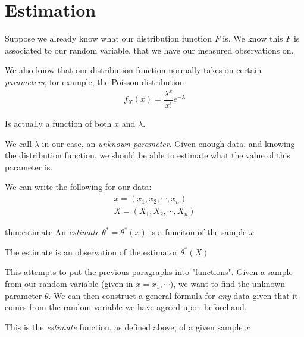 \section{Estimation}\par
\noindent Suppose we already know what our distribution function $F$ is. We know this $F$ is associated to our random variable, that we have our measured observations on.
\par
\noindent We also know that our distribution function normally takes on certain \textit{parameters}, for example, the Poisson distribution
\begin{equation*}
  \begin{gathered}
    f_X(x) = \dfrac{\lambda^x}{x!}e^{-\lambda}
  \end{gathered}
\end{equation*}\par
\noindent Is actually a function of both $x$ and $\lambda$.\par
\noindent We call $\lambda$ in our case, an \textit{unknown parameter}. Given enough data, and knowing the distribution function, we should be able to estimate what the value of this parameter is. 
\par\bigskip
\noindent We can write the following for our data:
\begin{equation*}
  \begin{gathered}
    x = (x_1,x_2,\cdots,x_n)\\
    X = (X_1,X_2,\cdots,X_n)
  \end{gathered}
\end{equation*}
\par\bigskip
\begin{theo}{thm:estimate}
  An \textit{estimate} $\theta^* = \theta^*(x)$ is a funciton of the sample $x$
  \par\bigskip
  \noindent The estimate is an observation of the estimator $\theta^*(X)$
\end{theo}
\par\bigskip
\noindent This attempts to put the previous paragraphs into "functions". Given a sample from our random variable (given in $x = x_1,\cdots$), we want to find the unknown parameter $\theta$. We can then construct a general formula for \textit{any} data given that it comes from the random variable we have agreed upon beforehand.\par
\noindent This is the \textit{estimate} function, as defined above, of a given sample $x$
\par\bigskip
